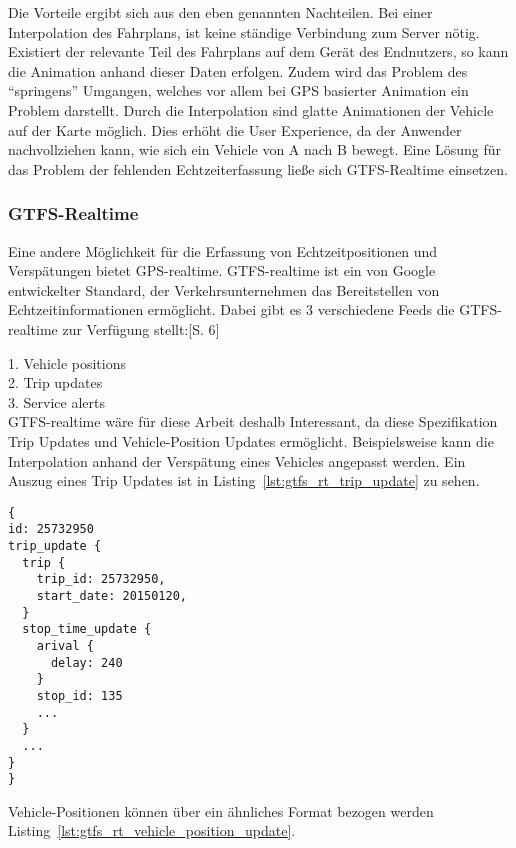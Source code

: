       Die Vorteile ergibt sich aus den eben genannten Nachteilen. Bei einer Interpolation des Fahrplans, ist keine ständige Verbindung zum Server nötig. Existiert der relevante Teil des Fahrplans auf dem Gerät des Endnutzers, so kann die Animation anhand dieser Daten erfolgen. Zudem wird das Problem des "`springens"' Umgangen, welches vor allem bei GPS basierter Animation ein Problem darstellt. Durch die Interpolation sind glatte Animationen der Vehicle auf der Karte möglich. Dies erhöht die User Experience, da der Anwender nachvollziehen kann, wie sich ein Vehicle von A nach B bewegt.
      Eine Lösung für das Problem der fehlenden Echtzeiterfassung ließe sich GTFS-Realtime einsetzen.
    
    
    \subsubsection{GTFS-Realtime}
    \label{ssub:gtfs_realtime}
      Eine andere Möglichkeit für die Erfassung von Echtzeitpositionen und Verspätungen bietet GPS-realtime. GTFS-realtime ist ein von Google entwickelter Standard, der Verkehrsunternehmen das Bereitstellen von Echtzeitinformationen ermöglicht. Dabei gibt es 3 verschiedene Feeds die GTFS-realtime zur Verfügung stellt:\parencite{zervaas_realtime}[S. 6]

      1. Vehicle positions\\
      2. Trip updates\\
      3. Service alerts\\

      GTFS-realtime wäre für diese Arbeit deshalb Interessant, da diese Spezifikation Trip Updates und Vehicle-Position Updates ermöglicht. Beispielsweise kann die Interpolation anhand der Verspätung eines Vehicles angepasst werden. Ein Auszug eines Trip Updates ist in Listing~\ref{lst:gtfs_rt_trip_update} zu sehen.

      \begin{lstlisting}[captionpos=b, caption={Auszug eines GTFS-realtime Trip Updates von MBTA},label={lst:gtfs_rt_trip_update}]
{
id: 25732950
trip_update {
  trip {
    trip_id: 25732950,
    start_date: 20150120,
  }
  stop_time_update {
    arival {
      delay: 240
    }
    stop_id: 135
    ...
  }
  ...
}
}
    \end{lstlisting}

    Vehicle-Positionen können über ein ähnliches Format bezogen werden Listing~\ref{lst:gtfs_rt_vehicle_position_update}.

